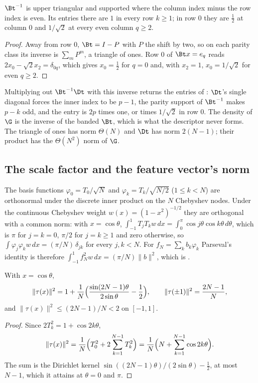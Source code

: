 \begin{proposition}
\label{prop:Bt-inverse}
$\Bt^{-1}$ is upper triangular and supported where the column index minus the row index is even. Its entries there are $1$ in every row $k\ge1$; in row $0$ they are $\tfrac12$ at column $0$ and $1/\sqrt2$ at every even column $q\ge2$.
\end{proposition}
\begin{proof}
Away from row $0$, $\Bt=I-P$ with $P$ the shift by two, so on each parity class its inverse is $\sum_mP^m$, a triangle of ones. Row $0$ of $\Bt x=e_q$ reads $2x_0-\sqrt2x_2=\delta_{0q}$, which gives $x_0=\tfrac12$ for $q=0$ and, with $x_2=1$, $x_0=1/\sqrt2$ for even $q\ge2$.
\end{proof}

Multiplying out $\Bt^{-1}\Dt$ with this inverse returns the entries of : $\Dt$'s single diagonal forces the inner index to be $p-1$, the parity support of $\Bt^{-1}$ makes $p-k$ odd, and the entry is $2p$ times one, or times $1/\sqrt2$ in row $0$. The density of $\G$ is the inverse of the banded $\Bt$, which is what the descriptor never forms. The triangle of ones has norm $\Theta(N)$ and $\Dt$ has norm $2(N-1)$; their product has the $\Theta(N^2)$ norm of $\G$.

\subsection{The scale factor and the feature vector's norm}
\label{app:eta-e}

The basis functions $\varphi_0=T_0/\sqrt N$ and $\varphi_k=T_k/\sqrt{N/2}$ ($1\le k<N$) are orthonormal under the discrete inner product on the $N$ Chebyshev nodes. Under the continuous Chebyshev weight $w(x)=(1-x^2)^{-1/2}$ they are orthogonal with a common norm: with $x=\cos\theta$, $\int_{-1}^1T_jT_kw\,dx=\int_0^\pi\cos j\theta\cos k\theta\,d\theta$, which is $\pi$ for $j=k=0$, $\pi/2$ for $j=k\ge1$ and zero otherwise, so $\int\varphi_j\varphi_kw\,dx=(\pi/N)\,\delta_{jk}$ for every $j,k<N$. For $f_N=\sum_kb_k\varphi_k$ Parseval's identity is therefore $\int_{-1}^1f_N^2w\,dx=(\pi/N)\|b\|^2$, which is .

\begin{proposition}
\label{prop:tau-norm}
With $x=\cos\theta$,
\begin{equation}
    \|\tau(x)\|^2=1+\frac1N\Bigl(\frac{\sin(2N-1)\theta}{2\sin\theta}-\frac12\Bigr),
    \qquad
    \|\tau(\pm1)\|^2=\frac{2N-1}{N},
\end{equation}
and $\|\tau(x)\|^2\le(2N-1)/N<2$ on $[-1,1]$.
\end{proposition}
\begin{proof}
Since $2T_k^2=1+\cos2k\theta$,
\begin{equation*}
    \|\tau(x)\|^2=\frac1N\Bigl(T_0^2+2\sum_{k=1}^{N-1}T_k^2\Bigr)=\frac1N\Bigl(N+\sum_{k=1}^{N-1}\cos2k\theta\Bigr).
\end{equation*}
The sum is the Dirichlet kernel $\sin((2N-1)\theta)/(2\sin\theta)-\tfrac12$, at most $N-1$, which it attains at $\theta=0$ and $\pi$.
\end{proof}

